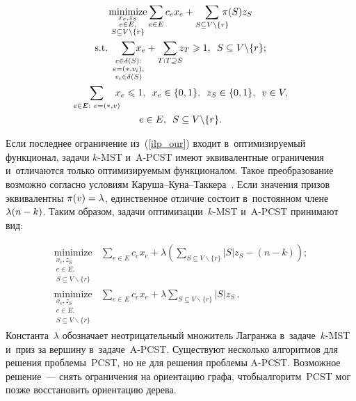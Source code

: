 \begin{multicols}{2}
\noindent
\begin{multline}
\underset{\substack{x_e,z_S \\ e\in E,\\ S\subseteq V\backslash \{r\}}}{\mbox{minimize}} 
\displaystyle \sum\limits_{e\in E} c_e x_e + \sum\limits_{S\subseteq V\backslash\{r\}}  \!\!\!\!\!\pi(S)z_S \\
\mbox{s.t.}\ \displaystyle \sum\limits_{\substack{e\in\delta(S):\\e=(\ast,v_i),\\ v_i\in\delta(S)}} \!\!\!\!\!\! x_e + 
\sum\limits_{T:T\supseteq S}  \!\!\! z_T\geqslant 1,\enskip  S\subseteq  V\backslash \{r\};\\
\displaystyle \sum\limits_{e\in E:~e=(\ast,v)}\!\!\!\!  x_e\leqslant 1,\enskip
x_e\in\{0,1\},\enskip z_S\in\{0,1\},\enskip  v\in V,\\
e\in E,\enskip S\subseteq V\backslash \{r\}.
\label{ilp_pcst_ord}
\end{multline}

\vspace*{-3pt}

\noindent
Если последнее ограничение из~(\ref{ilp_our}) входит в~оптимизируемый 
функционал, задачи $k$-MST и~A-PCST имеют эквивалентные 
ограничения и~отличаются только оптимизируемым функционалом. Такое 
преобразование возможно согласно условиям Ка\-ру\-ша--Ку\-на--Так\-ке\-ра~\cite{ras2017approximate}. Если значения призов 
эквивалентны $\pi(v) \hm=  \lambda$, единственное отличие состоит в~постоянном члене~$\lambda(n\hm-k)$. Таким 
образом, задачи оптимизации~$k$-MST и~A-PCST принимают вид:

\vspace*{-4pt}

\noindent
\begin{align*}
\underset{\substack{x_e,z_S \\ e\in E,\\ S\subseteq V\backslash \{r\}}}{\mbox{minimize}} & 
\sum\limits_{e\in E}c_ex_e + \lambda\left(\sum\limits_{S\subseteq V\backslash \{r\}}|S|z_S - (n-k)\right);\\ 
\underset{\substack{x_e,z_S \\ e\in E,\\ S\subseteq V\backslash \{r\}}}{\mbox{minimize}} & 
\sum\limits_{e\in E}c_ex_e + \lambda\sum\limits_{S\subseteq V\backslash\{r\}}|S|z_S\,. 
\end{align*}
%
Константа~$\lambda$ обозначает неотрицательный множитель Лагранжа в~задаче~$k$-MST и~приз за вершину\linebreak 
в~задаче~A-PCST. 
Существуют несколько алгоритмов для решения проблемы~PCST, но не для 
решения проб\-ле\-мы A-PCST. Возможное решение~--- снять 
ограничения на ориентацию графа, чтобы\linebreak алгоритм~PCST мог позже 
восстановить ориентацию дерева.


\end{multicols}
